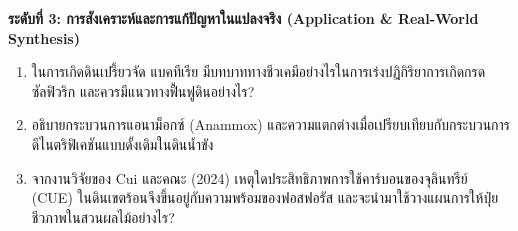 \noindent \textbf{ระดับที่ 3: การสังเคราะห์และการแก้ปัญหาในแปลงจริง (Application \& Real-World Synthesis)}
\begin{enumerate}[resume]
    \item ในการเกิดดินเปรี้ยวจัด แบคทีเรีย  มีบทบาททางชีวเคมีอย่างไรในการเร่งปฏิกิริยาการเกิดกรดซัลฟิวริก และควรมีแนวทางฟื้นฟูดินอย่างไร?
    \item อธิบายกระบวนการแอนาม็อกซ์ (Anammox) และความแตกต่างเมื่อเปรียบเทียบกับกระบวนการดีไนตริฟิเคชันแบบดั้งเดิมในดินน้ำขัง
    \item จากงานวิจัยของ Cui และคณะ (2024) เหตุใดประสิทธิภาพการใช้คาร์บอนของจุลินทรีย์ (CUE) ในดินเขตร้อนจึงขึ้นอยู่กับความพร้อมของฟอสฟอรัส และจะนำมาใช้วางแผนการให้ปุ๋ยชีวภาพในสวนผลไม้อย่างไร?
\end{enumerate}
